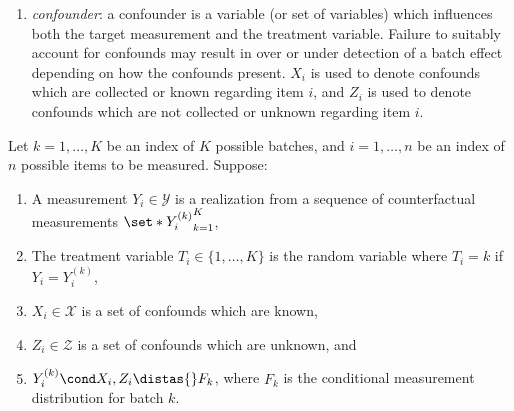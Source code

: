 \begin{enumerate}
\item \textit{confounder}: a confounder is a variable (or set of variables) which influences both the target measurement and the treatment variable. 
Failure to suitably account for confounds may result in over or under detection of a batch effect depending on how the confounds present. $X_i$ is used to denote confounds which are collected or known regarding item $i$, and $Z_i$ is used to denote confounds which are not collected or unknown regarding item $i$.
\end{enumerate}

\begin{assumption}
Let $k = 1, \hdots, K$ be an index of $K$ possible batches, and $i = 1, \hdots, n$ be an index of $n$ possible items to be measured. Suppose:
\begin{enumerate}
    \item A measurement $Y_i \in \mathcal Y$ is a realization from a sequence of counterfactual measurements $\set*{Y_i^{(k)}}_{k = 1}^K$,
    \item The treatment variable $T_i \in \{1,\hdots,K\}$ is the random variable where $T_i = k$ if $Y_i = Y_i^{(k)}$,
    \item $X_i \in \mathcal X$ is a set of confounds which are known,
    \item $Z_i \in \mathcal Z$ is a set of confounds which are unknown, and
    \item $Y_i^{(k)} \cond X_i, Z_i \distas{} F_k$, where $F_k$ is the conditional measurement distribution for batch $k$.
\end{enumerate}
\end{assumption}

